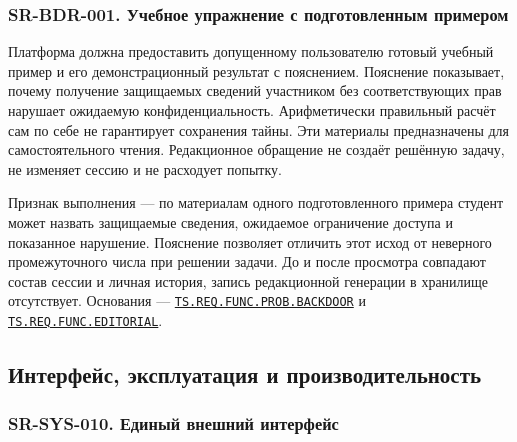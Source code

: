 \documentclass[12pt,a4paper]{article}
\begin{document}
\subsubsection{SR-BDR-001. Учебное упражнение с подготовленным примером}\label{sr-bdr-001-ux443ux447ux435ux431ux43dux43eux435-ux443ux43fux440ux430ux436ux43dux435ux43dux438ux435-ux441-ux43fux43eux434ux433ux43eux442ux43eux432ux43bux435ux43dux43dux44bux43c-ux43fux440ux438ux43cux435ux440ux43eux43c}

\hypertarget{sr-bdr-001-учебное-упражнение-с-подготовленным-примером}{}

\hypertarget{sr-bdr-001}{}

Платформа должна предоставить допущенному пользователю готовый учебный пример и его демонстрационный результат с пояснением. Пояснение показывает, почему получение защищаемых сведений участником без соответствующих прав нарушает ожидаемую конфиденциальность. Арифметически правильный расчёт сам по себе не гарантирует сохранения тайны. Эти материалы предназначены для самостоятельного чтения. Редакционное обращение не создаёт решённую задачу, не изменяет сессию и не расходует попытку.

Признак выполнения --- по материалам одного подготовленного примера студент может назвать защищаемые сведения, ожидаемое ограничение доступа и показанное нарушение. Пояснение позволяет отличить этот исход от неверного промежуточного числа при решении задачи. До и после просмотра совпадают состав сессии и личная история, запись редакционной генерации в хранилище отсутствует. Основания --- {\href{../02\_Техническое\_задание/DOC-02\_Техническое\_задание.pdf\#ts-req-func-prob-backdoor}{\texttt{TS.\allowbreak{}REQ.\allowbreak{}FUNC.\allowbreak{}PROB.\allowbreak{}BACKDOOR}}} и {\href{../02\_Техническое\_задание/DOC-02\_Техническое\_задание.pdf\#ts-req-func-editorial}{\texttt{TS.\allowbreak{}REQ.\allowbreak{}FUNC.\allowbreak{}EDITORIAL}}}.

\subsection{Интерфейс, эксплуатация и производительность}\label{ux438ux43dux442ux435ux440ux444ux435ux439ux441-ux44dux43aux441ux43fux43bux443ux430ux442ux430ux446ux438ux44f-ux438-ux43fux440ux43eux438ux437ux432ux43eux434ux438ux442ux435ux43bux44cux43dux43eux441ux442ux44c}

\hypertarget{интерфейс-эксплуатация-и-производительность}{}

\subsubsection{SR-SYS-010. Единый внешний интерфейс}\label{sr-sys-010-ux435ux434ux438ux43dux44bux439-ux432ux43dux435ux448ux43dux438ux439-ux438ux43dux442ux435ux440ux444ux435ux439ux441}
\end{document}
